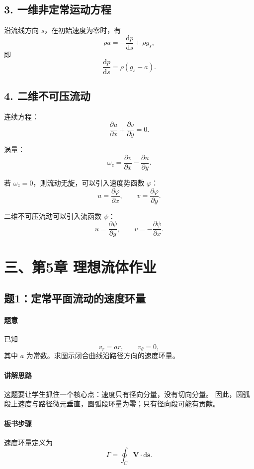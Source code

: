 ﻿\documentclass[12pt,a4paper]{ctexart}
\newcommand{\dd}{\mathrm d}
\begin{document}
\subsection*{3. 一维非定常运动方程}

沿流线方向 $s$，在初始速度为零时，有
\[
\rho a=-\frac{\dd p}{\dd s}+\rho g_s ,
\]
即
\[
\frac{\dd p}{\dd s}=\rho(g_s-a).
\]

\subsection*{4. 二维不可压流动}

连续方程：
\[
\frac{\partial u}{\partial x}
+\frac{\partial v}{\partial y}=0.
\]

涡量：
\[
\omega_z=
\frac{\partial v}{\partial x}
-\frac{\partial u}{\partial y}.
\]

若 $\omega_z=0$，则流动无旋，可以引入速度势函数 $\varphi$：
\[
u=\frac{\partial\varphi}{\partial x},\qquad
v=\frac{\partial\varphi}{\partial y}.
\]

二维不可压流动可以引入流函数 $\psi$：
\[
u=\frac{\partial\psi}{\partial y},\qquad
v=-\frac{\partial\psi}{\partial x}.
\]

\section*{三、第5章 理想流体作业}

\subsection*{题1：定常平面流动的速度环量}

\paragraph{题意}
已知
\[
v_r=ar,\qquad v_\theta=0,
\]
其中 $a$ 为常数。求图示闭合曲线沿路径方向的速度环量。

\paragraph{讲解思路}
这题要让学生抓住一个核心点：速度只有径向分量，没有切向分量。
因此，圆弧段上速度与路径微元垂直，圆弧段环量为零；只有径向段可能有贡献。

\paragraph{板书步骤}
速度环量定义为
\[
\Gamma=\oint_C \bm V\cdot \dd \bm s .
\]
\end{document}
